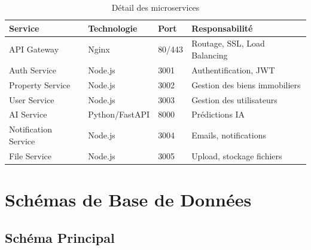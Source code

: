 \begin{table}[H]
\centering
\caption{Détail des microservices}
\begin{tabular}{|l|l|l|l|}
\hline
\textbf{Service} & \textbf{Technologie} & \textbf{Port} & \textbf{Responsabilité} \\
\hline
API Gateway & Nginx & 80/443 & Routage, SSL, Load Balancing \\
Auth Service & Node.js & 3001 & Authentification, JWT \\
Property Service & Node.js & 3002 & Gestion des biens immobiliers \\
User Service & Node.js & 3003 & Gestion des utilisateurs \\
AI Service & Python/FastAPI & 8000 & Prédictions IA \\
Notification Service & Node.js & 3004 & Emails, notifications \\
File Service & Node.js & 3005 & Upload, stockage fichiers \\
\hline
\end{tabular}
\end{table}

\section{Schémas de Base de Données}

\subsection{Schéma Principal}

